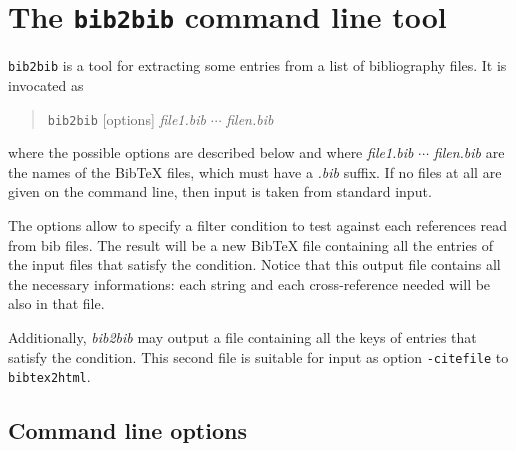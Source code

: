 \documentclass[11pt,a4paper]{article}
\begin{document}
\section{The \texttt{bib2bib} command line tool}

\texttt{bib2bib} is a tool for extracting some entries from a list of
bibliography files. It is invocated as 
\begin{quote}
\texttt{bib2bib} [options] \textit{file1.bib} $\cdots$ \textit{filen.bib}
\end{quote}
where the possible options are described below and where
\textit{file1.bib} $\cdots$ \textit{filen.bib} are the names of the
BibTeX files, which must have a \textit{.bib} suffix. If no files at
all are given on the command line, then input is taken from standard
input. 

The options allow to specify a filter condition to test against each
references read from bib files. The result will be a new BibTeX file
containing all the entries of the input files that satisfy the
condition. Notice that this output file contains all the necessary
informations: each string and each cross-reference needed will be also
in that file.

Additionally, \textit{bib2bib} may output a file containing all the
keys of entries that satisfy the condition. This second file is
suitable for input as option \verb|-citefile| to \verb|bibtex2html|.

\subsection{Command line options}
\end{document}
